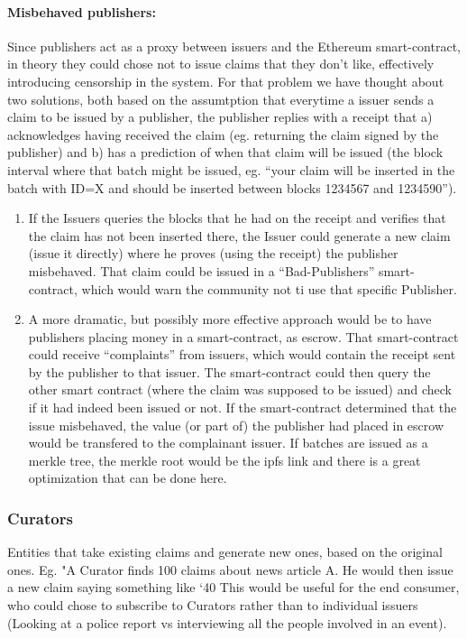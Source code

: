 \paragraph{Misbehaved publishers: } Since publishers act as a proxy between issuers and the Ethereum smart-contract, in theory they could chose not to issue claims that they don’t like, effectively introducing censorship in the system. For that problem we have thought about two solutions, both based on the assumtption that everytime a issuer sends a claim to be issued by a publisher, the publisher replies with a receipt that a) acknowledges having received the claim (eg. returning the claim signed by the publisher) and b) has a prediction of when that claim will be issued (the block interval where that batch might be issued, eg. “your claim will be inserted in the batch with ID=X and should be inserted between blocks 1234567 and 1234590”).
\begin{enumerate}
    \item If the Issuers queries the blocks that he had on the receipt and verifies that the claim has not been inserted there, the Issuer could generate a new claim (issue it directly) where he proves (using the receipt) the publisher misbehaved. That claim could be issued in a “Bad-Publishers” smart-contract, which would warn the community not ti use that specific Publisher.
    \item A more dramatic, but possibly more effective approach would be to have publishers placing money in a smart-contract, as escrow. That smart-contract could receive “complaints” from issuers, which would contain the receipt sent by the publisher to that issuer. The smart-contract could then query the other smart contract (where the claim was supposed to be issued) and check if it had indeed been issued or not. If the smart-contract determined that the issue misbehaved, the value (or part of) the publisher had placed in escrow would be transfered to the complainant issuer. If batches are issued as a merkle tree, the merkle root would be the ipfs link and there is a great optimization that can be done here.
\end{enumerate}

\subsubsection{Curators}
Entities that take existing claims and generate new ones, based on the original ones.
Eg. "A Curator finds 100 claims about news article A. He would then issue a new claim saying something like ‘40%
This would be useful for the end consumer, who could chose to subscribe to Curators rather than to individual issuers (Looking at a police report vs interviewing all the people involved in an event).

